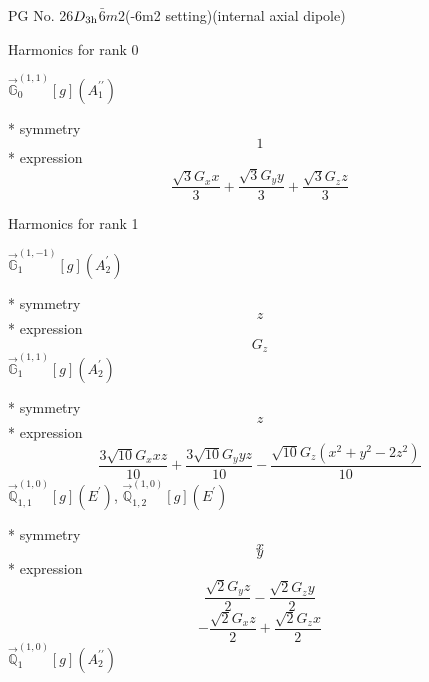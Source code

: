 \documentclass[fleqn,8pt]{jsarticle}
\begin{document}
\setcounter{MaxMatrixCols}{32}

\renewcommand{\tablename}{Table~}
\renewcommand{\figurename}{Figure~}
\begin{center}
\LARGE
PG No. 26\quad$D_{\rm 3h}$\quad$\bar{6}m2$\quad(-6m2 setting)\quad[ hexagonal ] (internal axial dipole)
\end{center}

\noindent * Harmonics for rank 0

\noindent\quad $\vec{\mathbb{G}}_{0}^{(1,1)}[g](A_{1}^{\prime\prime})$

\noindent\quad ** symmetry
\begin{dmath*}
1
\end{dmath*}
\noindent\quad ** expression
\begin{dmath*}
\frac{\sqrt{3} G_{x} x}{3} + \frac{\sqrt{3} G_{y} y}{3} + \frac{\sqrt{3} G_{z} z}{3}
\end{dmath*}

\noindent * Harmonics for rank 1

\noindent\quad $\vec{\mathbb{G}}_{1}^{(1,-1)}[g](A_{2}^{\prime})$

\noindent\quad ** symmetry
\begin{dmath*}
z
\end{dmath*}
\noindent\quad ** expression
\begin{dmath*}
G_{z}
\end{dmath*}
\noindent\quad $\vec{\mathbb{G}}_{1}^{(1,1)}[g](A_{2}^{\prime})$

\noindent\quad ** symmetry
\begin{dmath*}
z
\end{dmath*}
\noindent\quad ** expression
\begin{dmath*}
\frac{3 \sqrt{10} G_{x} x z}{10} + \frac{3 \sqrt{10} G_{y} y z}{10} - \frac{\sqrt{10} G_{z} \left(x^{2} + y^{2} - 2 z^{2}\right)}{10}
\end{dmath*}
\noindent\quad $\vec{\mathbb{Q}}_{1,1}^{(1,0)}[g](E^{\prime})$, $\vec{\mathbb{Q}}_{1,2}^{(1,0)}[g](E^{\prime})$

\noindent\quad ** symmetry
\begin{dmath*}
x
\end{dmath*}
\begin{dmath*}
y
\end{dmath*}
\noindent\quad ** expression
\begin{dmath*}
\frac{\sqrt{2} G_{y} z}{2} - \frac{\sqrt{2} G_{z} y}{2}
\end{dmath*}
\begin{dmath*}
- \frac{\sqrt{2} G_{x} z}{2} + \frac{\sqrt{2} G_{z} x}{2}
\end{dmath*}
\noindent\quad $\vec{\mathbb{Q}}_{1}^{(1,0)}[g](A_{2}^{\prime\prime})$
\end{document}

